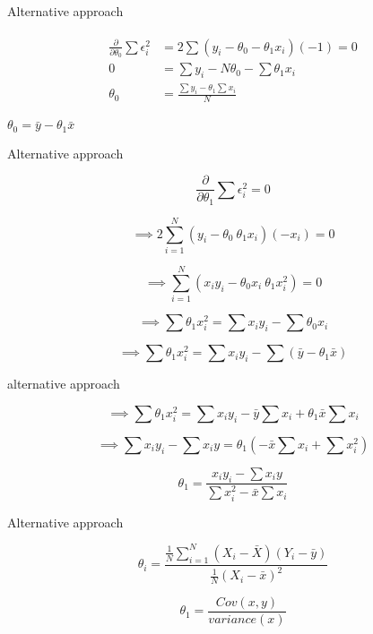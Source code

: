 \documentclass{beamer}
\begin{document}
\begin{frame}{Alternative approach}

\begin{align}
    \begin{split}
        \frac{\partial}{\partial \theta_{0}}\sum \epsilon_{i}^{2} &= 2\sum(y_{i} -  \theta_{0} - \theta_{1}x_{i})(-1) = 0 \\
        0 &= \sum y_{i} -  N\theta_{0} - \sum \theta_{1}x_{i}\\
        \theta_{0} &= \frac{\sum y_{i} - \theta_{1}\sum x_{i}}{N}
    \end{split}
\end{align}


\begin{tcolorbox}
\begin{center}
    $ \theta_{0} = \bar{y} - \theta_{1} \bar{x}$
\end{center}
\end{tcolorbox}
        


\end{frame}
\begin{frame}{Alternative approach}

$$
\frac{\partial}{\partial \theta_{1}}\sum \epsilon_{i}^{2} = 0
$$


$$
\implies 2 \sum_{i=1}^{N} (y_{i} - \theta_{0} \ \theta_{1}x_{i})(-x_{i}) = 0
$$

$$
\implies \sum_{i=1}^{N} (x_{i}y_{i} - \theta_{0}x_{i} \ \theta_{1}x_{i}^{2}) = 0
$$

$$
\implies \sum  \theta_{1}x_{i}^{2} = \sum x_{i}y_{i} - \sum \theta_{0}x_{i}
$$

$$
\implies \sum  \theta_{1}x_{i}^{2} = \sum x_{i}y_{i} - \sum (\bar{y} - \theta_{1}\bar{x})
$$


\end{frame}

\begin{frame}{alternative approach}


$$
\implies \sum  \theta_{1}x_{i}^{2} = \sum x_{i}y_{i} - \bar{y}\sum x_{i} + \theta_{1}\bar{x}\sum x_{i} 
$$

$$
\implies \sum  
x_{i}y_{i} - \sum x_{i}y = \theta_{1} (-\bar{x}\sum x_{i} + \sum x_{i}^{2})
$$

$$
\theta_{1} = \frac{x_{i}y_{i} - \sum x_{i}y}{\sum x_{i}^{2} -\bar{x}\sum x_{i}}
$$

    
\end{frame}

\begin{frame}{Alternative approach}
    
    $$
    \theta_{i} = \frac{ \frac{1}{N} \sum_{i=1}^{N}(X_{i} - \bar{X})(Y_{i} - \bar{y})}{\frac{1}{N}(X_{i} - \bar{x})^{2}}
    $$
    
    $$
    \theta_{1} = \frac{Cov(x,y)}{variance(x)}
    $$
    
\end{frame}
        
\end{document}
